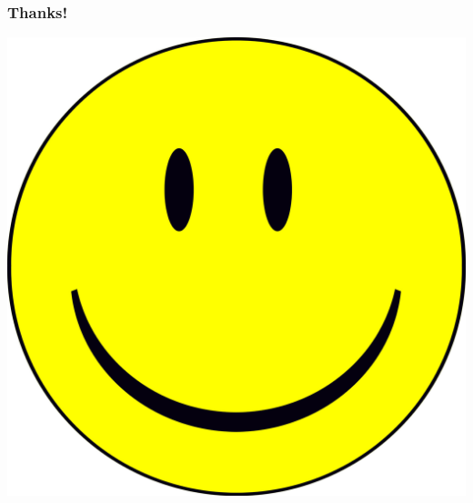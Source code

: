 \documentclass{beamer}
\begin{document}
\begin{frame}
\frametitle{Thanks!}
\begin{center}
\includegraphics[scale=0.35]{thanks}
\end{center}
\end{frame}
\end{document}
